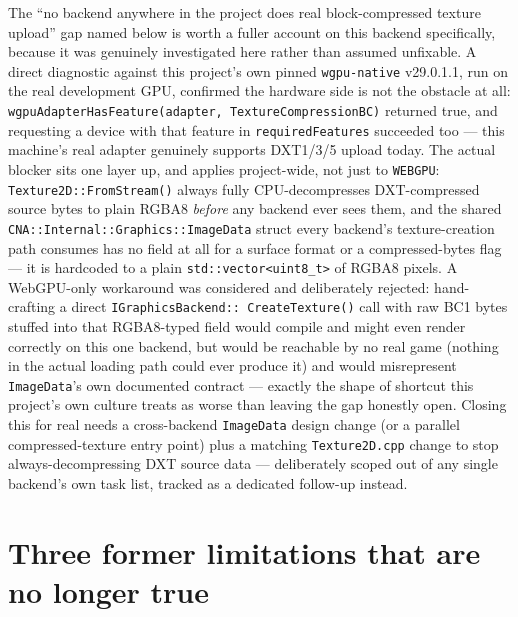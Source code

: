 The ``no backend anywhere in the project does real block-compressed texture upload'' gap named
below is worth a fuller account on this backend specifically, because it was genuinely
investigated here rather than assumed unfixable. A direct diagnostic against this project's own
pinned \texttt{wgpu-native} v29.0.1.1, run on the real development GPU, confirmed the hardware
side is not the obstacle at all: \texttt{wgpuAdapterHasFeature(adapter,
TextureCompressionBC)} returned true, and requesting a device with that feature in
\texttt{requiredFeatures} succeeded too --- this machine's real adapter genuinely supports
DXT1/3/5 upload today. The actual blocker sits one layer up, and applies project-wide, not just
to \texttt{WEBGPU}: \texttt{Texture2D::FromStream()} always fully CPU-decompresses DXT-compressed
source bytes to plain RGBA8 \emph{before} any backend ever sees them, and the shared
\texttt{CNA::Internal::Graphics::ImageData} struct every backend's texture-creation path
consumes has no field at all for a surface format or a compressed-bytes flag --- it is
hardcoded to a plain \texttt{std::vector<uint8\_t>} of RGBA8 pixels. A WebGPU-only workaround
was considered and deliberately rejected: hand-crafting a direct \texttt{IGraphicsBackend::%
CreateTexture()} call with raw BC1 bytes stuffed into that RGBA8-typed field would compile and
might even render correctly on this one backend, but would be reachable by no real game (nothing
in the actual  loading path could ever produce it) and would misrepresent
\texttt{ImageData}'s own documented contract --- exactly the shape of shortcut this project's
own culture treats as worse than leaving the gap honestly open. Closing this for real needs a
cross-backend \texttt{ImageData} design change (or a parallel compressed-texture entry point)
plus a matching \texttt{Texture2D.cpp} change to stop always-decompressing DXT source data ---
deliberately scoped out of any single backend's own task list, tracked as a dedicated follow-up
instead.

\section{Three former limitations that are no longer true}

